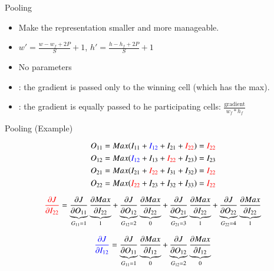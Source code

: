 \documentclass{KBook}
\begin{document}
Pooling
	
	\begin{minipage}{0.60\textwidth} 
		\begin{itemize}
			\item Make the representation smaller and more manageable.
			\item $ w' = \frac{w - w_f + 2P}{S} + 1$,  $ h' = \frac{h - h_f + 2P}{S} + 1$
			\item No parameters 
			\item {}: the gradient is passed only to the winning cell (which has the max).
			\item {}: the gradient is equally passed to he participating cells: $\frac{\text{gradient}}{w_f * h_f}$ 
		\end{itemize}
	\end{minipage}
	\begin{minipage}{0.39\textwidth}
	\end{minipage}
	
Pooling (Example)
	
	\begin{center}
		\vskip-6pt
	\end{center}\vskip-16pt
	
	{\scriptsize 
		\[O_{11} = Max(I_{11} + \textcolor{blue}{I_{12}} + I_{21} + \textcolor{red}{I_{22}}) = \textcolor{red}{I_{22}}  \]
		\[O_{12} = Max(\textcolor{blue}{I_{12}} + I_{13} + \textcolor{red}{I_{22}} + I_{23}) = I_{23}  \]
		\[O_{21} = Max(I_{21} + \textcolor{red}{I_{22}} + I_{31} + I_{32}) = \textcolor{red}{I_{22}} \]
		\[O_{22} = Max(\textcolor{red}{I_{22}} + I_{23} + I_{32} + I_{33}) = \textcolor{red}{I_{22}}  \]
		
		\[\textcolor{red}{\frac{\partial J}{\partial I_{22}}} 
		= \underbrace{\frac{\partial J}{\partial O_{11}}}_{G_{11} = 1} 
		\underbrace{\frac{\partial Max}{\partial I_{22}}}_{1}
		+ \underbrace{\frac{\partial J}{\partial O_{12}}}_{G_{12} = 2} 
		\underbrace{\frac{\partial Max}{\partial I_{22}}}_{0}
		+ \underbrace{\frac{\partial J}{\partial O_{21}}}_{G_{21} = 3} 
		\underbrace{\frac{\partial Max}{\partial I_{22}}}_{1}
		+ \underbrace{\frac{\partial J}{\partial O_{22}}}_{G_{22} = 4} 
		\underbrace{\frac{\partial Max}{\partial I_{22}}}_{1}\]
		
		\[\textcolor{blue}{\frac{\partial J}{\partial I_{12}}} 
		= \underbrace{\frac{\partial J}{\partial O_{11}}}_{G_{11} = 1} 
		\underbrace{\frac{\partial Max}{\partial I_{12}}}_{0}
		+ \underbrace{\frac{\partial J}{\partial O_{12}}}_{G_{12} = 2} 
		\underbrace{\frac{\partial Max}{\partial I_{12}}}_{0}\]
	}
	
\end{document}

